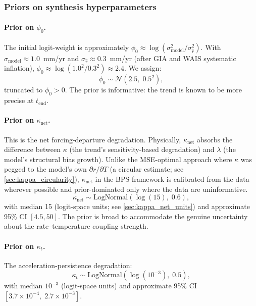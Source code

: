 \documentclass[11pt]{article}
\newcommand{\tend}{t_{\mathrm{end}}}
\newcommand{\sigr}{\sigma_{\hat{r}}}
\newcommand{\sigmodel}{\sigma_{\mathrm{model}}}
\begin{document}
\subsubsection{Priors on synthesis hyperparameters}
\label{sec:psi_priors}

\paragraph{Prior on $\phi_0$.}  The initial logit-weight is approximately $\phi_0 \approx \log(\sigmodel^2 / \sigr^2)$.  With $\sigmodel \approx 1.0$~mm/yr and $\sigr \approx 0.3$~mm/yr (after GIA and WAIS systematic inflation), $\phi_0 \approx \log(1.0^2 / 0.3^2) \approx 2.4$.  We assign:
\begin{equation}
  \phi_0 \sim \mathcal{N}(2.5,\; 0.5^2),
  \label{eq:phi0_prior}
\end{equation}
truncated to $\phi_0 > 0$.  The prior is informative: the trend is known to be more precise at $\tend$.

\paragraph{Prior on $\kappa_{\mathrm{net}}$.}  This is the net forcing-departure degradation.  Physically, $\kappa_{\mathrm{net}}$ absorbs the difference between $\kappa$ (the trend's sensitivity-based degradation) and $\lambda$ (the model's structural bias growth).  Unlike the MSE-optimal approach where $\kappa$ was pegged to the model's own $\partial r / \partial T$ (a circular estimate; see \cref{sec:kappa_circularity}), $\kappa_{\mathrm{net}}$ in the BPS framework is calibrated from the data wherever possible and prior-dominated only where the data are uninformative.
\begin{equation}
  \kappa_{\mathrm{net}} \sim \mathrm{LogNormal}(\log(15),\; 0.6),
  \label{eq:kappa_net_prior}
\end{equation}
with median 15 (logit-space units; see \cref{sec:kappa_net_units}) and approximate 95\% CI $[4.5, 50]$.  The prior is broad to accommodate the genuine uncertainty about the rate--temperature coupling strength.

\paragraph{Prior on $\kappa_t$.}  The acceleration-persistence degradation:
\begin{equation}
  \kappa_t \sim \mathrm{LogNormal}(\log(10^{-3}),\; 0.5),
  \label{eq:kappa_t_prior}
\end{equation}
with median $10^{-3}$ (logit-space units) and approximate 95\% CI $[3.7 \times 10^{-4},\; 2.7 \times 10^{-3}]$.
\end{document}
